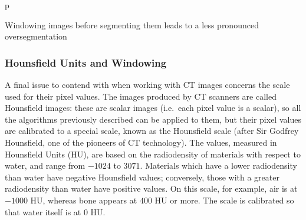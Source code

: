 \begin{stusubfig}{p}
	\hspace{4mm}%
\caption{Windowing images before segmenting them leads to a less pronounced oversegmentation}
\label{fig:segmentation-watershed-hounsfieldvswindowed}
\end{stusubfig}

\subsubsection{Hounsfield Units and Windowing}

A final issue to contend with when working with CT images concerns the scale used for their pixel values. The images produced by CT scanners are called Hounsfield images: these are scalar images (i.e.~each pixel value is a scalar), so all the algorithms previously described can be applied to them, but their pixel values are calibrated to a special scale, known as the Hounsfield scale (after Sir Godfrey Hounsfield, one of the pioneers of CT technology). The values, measured in Hounsfield Units (HU), are based on the radiodensity of materials with respect to water, and range from $-1024$ to $3071$. Materials which have a lower radiodensity than water have negative Hounsfield values; conversely, those with a greater radiodensity than water have positive values. On this scale, for example, air is at $-1000$ HU, whereas bone appears at $400$ HU or more. The scale is calibrated so that water itself is at $0$ HU.

